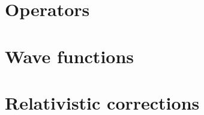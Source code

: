 \documentclass{physics_notes}
\begin{document}
\section{Operators}\label{sec:operators}


\section{Wave functions}\label{sec:wave_functions}


\section{Relativistic corrections}\label{sec:relativistic_corrections}

\end{document}
